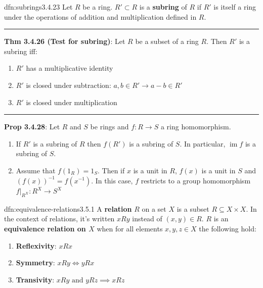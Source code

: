 \documentclass[landscape, 8pt]{extarticle}
\DeclareMathOperator{\im}{im}
\begin{document}
\begin{multicols}{3}
\begin{dfn}[Subrings]{dfn:subrings}{3.4.23}
    Let $R$ be a ring. $R' \subset R$ is a \textbf{subring} of $R$ if $R'$ is itself a ring under the operations of addition and multiplication defined in $R$.

    \noindent\rule{\textwidth}{0.2pt}
    \textbf{Thm 3.4.26 (Test for subring)}: Let $R$ be a subset of a ring $R$. Then $R'$ is a subring iff:
    \begin{enumerate}
        \setlength\itemsep{0em}
        \item $R'$ has a multiplicative identity
        \item $R'$ is closed under subtraction: $a,b\in R' \to a-b\in R'$
        \item $R'$ is closed under multiplication
    \end{enumerate}

    \noindent\rule{\textwidth}{0.2pt}
    \textbf{Prop 3.4.28}: Let $R$ and $S$ be rings and $f : R \to S$ a ring homomorphism.
    \begin{enumerate}
        \setlength\itemsep{0em}
        \item If $R'$ is a subring of $R$ then $f(R')$ is a subring of $S$. In particular, $\im f$ is a subring of $S$.
        \item Assume that $f(1_{R}) = 1_{S}$. Then if $x$ is a unit in $R$, $f(x)$ is a unit in $S$ and $(f(x))^{-1} = f(x^{-1})$. In this case, $f$ restricts to a group homomorphism $f \rvert_{R^{X}} : R^{X} \to S^{X}$
    \end{enumerate}
\end{dfn}

\begin{dfn}{dfn:equivalence-relations}{3.5.1}
    A \textbf{relation} $R$ on a set $X$ is a subset $R \subseteq X \times X $. In the context of relations, it's written $xRy$ instead of $(x,y)\in R$. $R$ is an \textbf{equivalence relation on $X$} when for all elements $x, y, z\in X$ the following hold:
    \begin{enumerate}
        \setlength\itemsep{0em}
        \item \textbf{Reflexivity}: $xRx$
        \item \textbf{Symmetry}: $xRy \iff yRx$
        \item \textbf{Transivity}: $xRy \text{ and } yRz \implies xRz$
    \end{enumerate}
\end{dfn}


\end{multicols}
\end{document}
